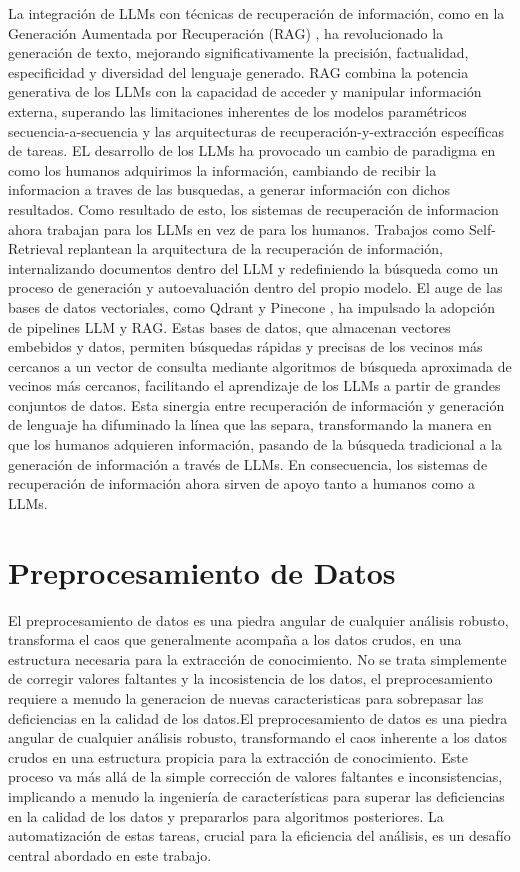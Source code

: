 La integración de LLMs con técnicas de recuperación de información, como en la Generación Aumentada por Recuperación (RAG) \cite{rag}, ha revolucionado la generación de texto, mejorando significativamente la precisión, factualidad, especificidad y diversidad del lenguaje generado. RAG combina la potencia generativa de los LLMs con la capacidad de acceder y manipular información externa, superando las limitaciones inherentes de los modelos paramétricos secuencia-a-secuencia y las arquitecturas de recuperación-y-extracción específicas de tareas.
EL desarrollo de los LLMs ha provocado un cambio de paradigma en como los humanos adquirimos la información, cambiando de recibir la informacion a traves de las busquedas, a generar información con dichos resultados. Como resultado de esto, los sistemas de recuperación de informacion ahora trabajan para los LLMs en vez de para los humanos. Trabajos como Self-Retrieval \cite{selfretrieval} replantean la arquitectura de la recuperación de información, internalizando documentos dentro del LLM y redefiniendo la búsqueda como un proceso de generación y autoevaluación dentro del propio modelo.
El auge de las bases de datos vectoriales, como Qdrant \cite{qdrant} y Pinecone \cite{pinecone}, ha impulsado la adopción de pipelines LLM y RAG. Estas bases de datos, que almacenan vectores embebidos y datos, permiten búsquedas rápidas y precisas de los vecinos más cercanos a un vector de consulta mediante algoritmos de búsqueda aproximada de vecinos más cercanos, facilitando el aprendizaje de los LLMs a partir de grandes conjuntos de datos. Esta sinergia entre recuperación de información y generación de lenguaje ha difuminado la línea que las separa, transformando la manera en que los humanos adquieren información, pasando de la búsqueda tradicional a la generación de información a través de LLMs. En consecuencia, los sistemas de recuperación de información ahora sirven de apoyo tanto a humanos como a LLMs. 

\section{Preprocesamiento de Datos}

El preprocesamiento de datos es una piedra angular de cualquier análisis robusto, transforma el caos que generalmente acompaña a los datos crudos, en una estructura necesaria para la extracción de conocimiento. No se trata simplemente de corregir valores faltantes y la incosistencia de los datos, el preprocesamiento requiere a menudo la generacion de nuevas caracteristicas para sobrepasar las deficiencias en la calidad de los datos.El preprocesamiento de datos es una piedra angular de cualquier análisis robusto, transformando el caos inherente a los datos crudos en una estructura propicia para la extracción de conocimiento. Este proceso va más allá de la simple corrección de valores faltantes e inconsistencias, implicando a menudo la ingeniería de características para superar las deficiencias en la calidad de los datos y prepararlos para algoritmos posteriores. La automatización de estas tareas, crucial para la eficiencia del análisis, es un desafío central abordado en este trabajo.

